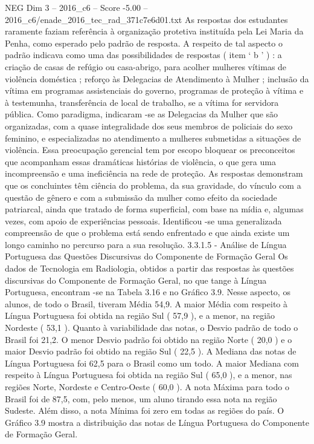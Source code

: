 \begin{textsample}{NEG Dim 3 – 2016\_c6 – Score -5.00 – 2016\_c6/enade\_2016\_tec\_rad\_371c7e6d01.txt}
As respostas dos estudantes raramente faziam referência à organização protetiva instituída pela Lei Maria da Penha, como esperado pelo padrão de resposta.
A respeito de tal aspecto o padrão indicava como uma das possibilidades de respostas ( item ‘ b ’ ) : a criação de casas de refúgio ou casa-abrigo, para acolher mulheres vítimas de violência doméstica ; reforço às Delegacias de Atendimento à Mulher ; inclusão da vítima em programas assistenciais do governo, programas de proteção à vítima e à testemunha, transferência de local de trabalho, se a vítima for servidora pública.
Como paradigma, indicaram -se as Delegacias da Mulher que são organizadas, com a quase integralidade dos seus membros de policiais do sexo feminino, e especializadas no atendimento a mulheres submetidas a situações de violência.
Essa preocupação gerencial tem por escopo bloquear os preconceitos que acompanham essas dramáticas histórias de violência, o que gera uma incompreensão e uma ineficiência na rede de proteção.
As respostas demonstram que os concluintes têm ciência do problema, da sua gravidade, do vínculo com a questão de gênero e com a submissão da mulher como efeito da sociedade patriarcal, ainda que tratado de forma superficial, com base na mídia e, algumas vezes, com apoio de experiências pessoais.
Identificou -se uma generalizada compreensão de que o problema está sendo enfrentado e que ainda existe um longo caminho no percurso para a sua resolução. 3.3.1.5 - Análise de Língua Portuguesa das Questões Discursivas do Componente de Formação Geral Os dados de Tecnologia em Radiologia, obtidos a partir das respostas às questões discursivas do Componente de Formação Geral, no que tange à Língua Portuguesa, encontram -se na Tabela 3.16 e no Gráfico 3.9.
Nesse aspecto, os alunos, de todo o Brasil, tiveram Média 54,9.
A maior Média com respeito à Língua Portuguesa foi obtida na região Sul ( 57,9 ), e a menor, na região Nordeste ( 53,1 ).
Quanto à variabilidade das notas, o Desvio padrão de todo o Brasil foi 21,2.
O menor Desvio padrão foi obtido na região Norte ( 20,0 ) e o maior Desvio padrão foi obtido na região Sul ( 22,5 ).
A Mediana das notas de Língua Portuguesa foi 62,5 para o Brasil como um todo.
A maior Mediana com respeito à Língua Portuguesa foi obtida na região Sul ( 65,0 ), e a menor, nas regiões Norte, Nordeste e Centro-Oeste ( 60,0 ).
A nota Máxima para todo o Brasil foi de 87,5, com, pelo menos, um aluno tirando essa nota na região Sudeste.
Além disso, a nota Mínima foi zero em todas as regiões do país.
O Gráfico 3.9 mostra a distribuição das notas de Língua Portuguesa do Componente de Formação Geral.

\end{textsample}
